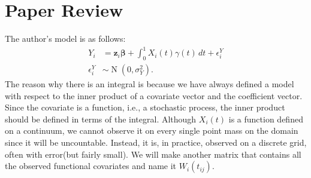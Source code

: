 \documentclass[11pt]{article}
\newcommand{\bs}{\boldsymbol}
\newcommand{\opn}{\operatorname}
\begin{document}
\section{Paper Review}
The author's model is as follows:
\begin{align}
  Y_{i} &= \bs{z}_{i}\bs{\beta} + \int_{0}^{1} X_{i}\left(t\right)\gamma\left(t\right)\,dt + \epsilon_{i}^{Y}\\
  \epsilon_{i}^{Y} &\sim \opn{N}\left(0,\sigma_{Y}^{2}\right).
\end{align}
The reason why there is an integral is because we have always defined a model with respect to the inner product of a covariate vector and the coefficient vector. Since the covariate is a function, i.e., a stochastic process, the inner product should be defined in terms of the integral. Although $X_{i}\left(t\right)$ is a function defined on a continuum, we cannot observe it on every single point mass on the domain since it will be uncountable. Instead, it is, in practice, observed on a discrete grid, often with error(but fairly small). We will make another matrix that contains all the observed functional covariates and name it $W_{i}\left(t_{ij}\right)$.
\end{document}
